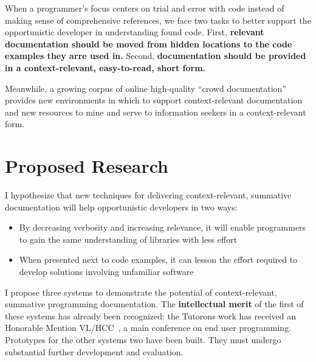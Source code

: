 \documentclass[12pt]{memoir}
\begin{document}
When a programmer's focus centers on trial and error with code instead of making sense of comprehensive references, we face two tasks to better support the opportunistic developer in understanding found code.
First, \textbf{relevant documentation should be moved from hidden locations to the code examples they arre used in.}
Second, \textbf{documentation should be provided in a context-relevant, easy-to-read, short form.}

Meanwhile, a growing corpus of online high-quality ``crowd documentation''~\cite{parnin_crowd_2012} provides new environments in which to support context-relevant documentation and new resources to mine and serve to information seekers in a context-relevant form.

\section{Proposed Research}

I hypothesize that new techniques for delivering context-relevant, summative documentation will help opportunistic developers in two ways:
\begin{itemize}[noitemsep,topsep=0pt]
\item By decreasing verbosity and increasing relevance, it will enable programmers to gain the same understanding of libraries with less effort
\item When presented next to code examples, it can lesson the effort required to develop solutions involving unfamiliar software
\end{itemize}

I propose three systems to demonstrate the potential of context-relevant, summative programming documentation.
The \textbf{intellectual merit} of the first of these systems has already been recognized:
the Tutorons work has received an Honorable Mention VL/HCC~\cite{head_tutorons_2015}, a main conference on end user programming.
Prototypes for the other systems two have been built.
They must undergo substantial further development and evaluation.
\end{document}
